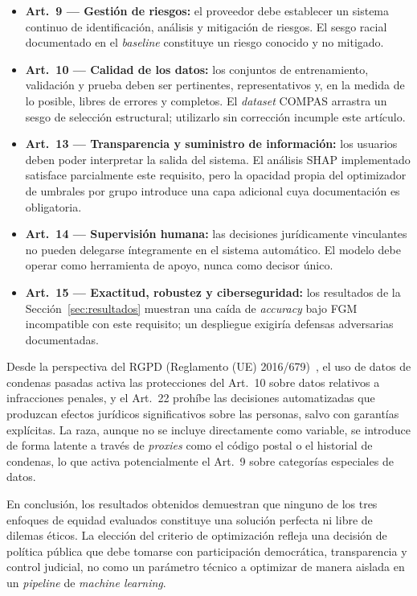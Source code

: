 \documentclass[11pt,a4paper]{article}
\begin{document}
\begin{itemize}
    \item \textbf{Art.~9 --- Gestión de riesgos:} el proveedor debe establecer un sistema continuo de identificación, análisis y mitigación de riesgos. El sesgo racial documentado en el \textit{baseline} constituye un riesgo conocido y no mitigado.
    \item \textbf{Art.~10 --- Calidad de los datos:} los conjuntos de entrenamiento, validación y prueba deben ser pertinentes, representativos y, en la medida de lo posible, libres de errores y completos. El \textit{dataset} COMPAS arrastra un sesgo de selección estructural; utilizarlo sin corrección incumple este artículo.
    \item \textbf{Art.~13 --- Transparencia y suministro de información:} los usuarios deben poder interpretar la salida del sistema. El análisis SHAP implementado satisface parcialmente este requisito, pero la opacidad propia del optimizador de umbrales por grupo introduce una capa adicional cuya documentación es obligatoria.
    \item \textbf{Art.~14 --- Supervisión humana:} las decisiones jurídicamente vinculantes no pueden delegarse íntegramente en el sistema automático. El modelo debe operar como herramienta de apoyo, nunca como decisor único.
    \item \textbf{Art.~15 --- Exactitud, robustez y ciberseguridad:} los resultados de la Sección~\ref{sec:resultados} muestran una caída de \textit{accuracy} bajo FGM incompatible con este requisito; un despliegue exigiría defensas adversarias documentadas.
\end{itemize}

Desde la perspectiva del RGPD (Reglamento (UE) 2016/679)~\cite{gdpr2016}, el uso de datos de condenas pasadas activa las protecciones del Art.~10 sobre datos relativos a infracciones penales, y el Art.~22 prohíbe las decisiones automatizadas que produzcan efectos jurídicos significativos sobre las personas, salvo con garantías explícitas. La raza, aunque no se incluye directamente como variable, se introduce de forma latente a través de \textit{proxies} como el código postal o el historial de condenas, lo que activa potencialmente el Art.~9 sobre categorías especiales de datos.

En conclusión, los resultados obtenidos demuestran que ninguno de los tres enfoques de equidad evaluados constituye una solución perfecta ni libre de dilemas éticos. La elección del criterio de optimización refleja una decisión de política pública que debe tomarse con participación democrática, transparencia y control judicial, no como un parámetro técnico a optimizar de manera aislada en un \textit{pipeline} de \textit{machine learning}.
\end{document}
